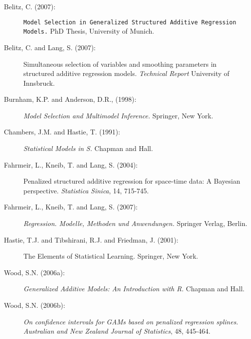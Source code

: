 \begin{description}
\item[Belitz, C. (2007):] {\tt Model Selection in Generalized Structured Additive Regression Models.} PhD Thesis, University of Munich.

\item [Belitz, C. and Lang, S. (2007):] Simultaneous selection of variables and smoothing
parameters in structured additive regression models. {\it Technical Report} University of Innsbruck.

\item[Burnham, K.P. and Anderson, D.R., (1998):] {\it Model Selection and Multimodel Inference.} Springer, New York.

\item[Chambers, J.M. and Hastie, T. (1991):] {\it Statistical Models in S.} Chapman and Hall.

\item[Fahrmeir, L., Kneib, T. and Lang, S. (2004):] Penalized
structured additive regression for space-time data: A Bayesian
perspective. {\it Statistica Sinica}, 14, 715-745.

\item[Fahrmeir, L., Kneib, T. and Lang, S. (2007):] {\it Regression. Modelle, Methoden und Anwendungen.} Springer Verlag, Berlin.

\item[Hastie, T.J. and Tibshirani, R.J. and Friedman, J. (2001):] The Elements of Statistical Learning. Springer, New York.

\item[Wood, S.N. (2006a):] {\it Generalized Additive Models: An Introduction with R.} Chapman and Hall.

\item[Wood, S.N. (2006b):] {\it On confidence intervals for GAMs based on penalized regression splines.}
{\it Australian and New Zealand Journal of Statistics}, 48, 445-464.
\end{description}





